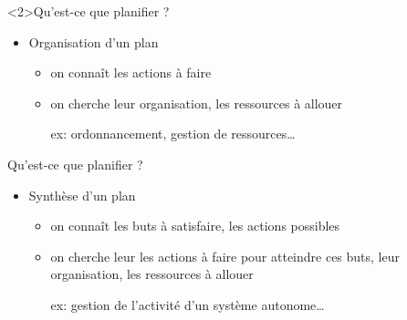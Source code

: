 \documentclass[compress]{beamer}
\begin{document}
\begin{frame}<2>{Qu'est-ce que planifier ?}
\begin{itemize}
\item {} Organisation d'un plan
	\begin{itemize}
	\item on connaît les actions à faire
	\item on cherche leur organisation, les ressources à allouer
	\item[ex:] ordonnancement, gestion de ressources\dots
	\end{itemize}
\end{itemize}
\begin{center}
\end{center}
\end{frame}

\begin{frame}{Qu'est-ce que planifier ?}
\begin{itemize}
\item {} Synthèse d'un plan
	\begin{itemize}
	\item on connaît les buts à satisfaire, les actions possibles
	\item on cherche leur les actions à faire pour atteindre ces buts, 
		leur organisation, les ressources à allouer
	\item[ex:] gestion de l'activité d'un système autonome\dots
	\end{itemize}
\end{itemize}
\end{frame}
\end{document}
